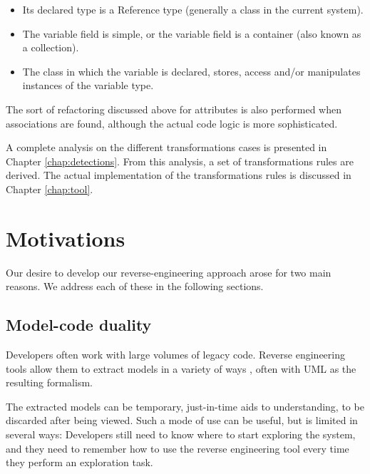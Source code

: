 \begin{itemize}
\item Its declared type is a Reference type (generally a class in the current system).
\item The variable field is simple, or the variable field is a container (also known as a collection).
\item The class in which the variable is declared, stores, access and/or manipulates instances of the variable type.


\end{itemize}

The sort of refactoring discussed above for attributes is also performed when associations are found, although the actual code logic is more sophisticated.

A complete analysis on the different transformations cases is presented in Chapter \ref{chap:detections}. From this analysis, a set of transformations rules are derived. The actual implementation of the transformations rules is discussed in Chapter \ref{chap:tool}.


\section{Motivations}

Our desire to develop our reverse-engineering approach arose for two main reasons. We address each of these in the following sections.

\subsection{Model-code duality}

Developers often work with large volumes of legacy code. Reverse engineering tools allow them to extract models in a variety of ways \cite{OsmanChaudron}, often with UML as the resulting formalism.

The extracted models can be temporary, just-in-time aids to understanding, to be discarded after being viewed. Such a mode of use can be useful, but is limited in several ways: Developers still need to know where to start exploring the system, and they need to remember how to use the reverse engineering tool every time they perform an exploration task. 

